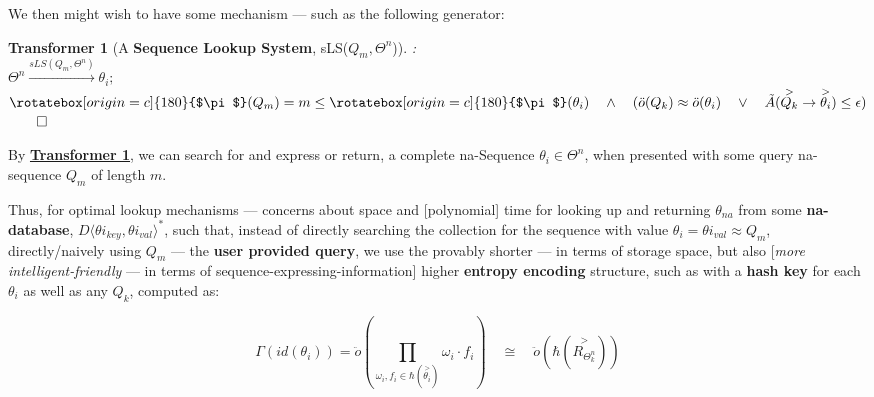 \documentclass[a4paper, 18pt]{book} %
\newtheorem{transf}{Transformer}
\newcommand{\invpi}{\rotatebox[origin=c]{180}{$\pi$}}
\begin{document}
We then might wish to have some mechanism --- such as the following generator:

\vspace{1em}
\begin{transf}[A \textbf{Sequence Lookup System}, sLS($Q_m,\Theta^n$)]:
\label{TRANSFSEQLOOKUP}
$ $\\
$\Theta^n \xrightarrow{sLS(Q_m,\Theta^n)} \theta_i;$\\ 
$\invpi(Q_m) = m \leq \invpi(\theta_i) \quad \land \quad (\ddot{o}(Q_k) \approx \ddot{o}(\theta_i) \quad \lor \quad \tilde{A}(\overset{>}{Q_k} \rightarrow \overset{>}{\theta_i}) \leq \epsilon)$\\
$\qed$
\end{transf}
\vspace{1em}


By \textbf{\hyperref[TRANSFSEQLOOKUP]{Transformer \ref{TRANSFSEQLOOKUP}}}, we can search for and express or return, a complete na-Sequence $\theta_i \in \Theta^n$, when presented with some query na-sequence $Q_m$ of length $m$.

Thus, for optimal lookup mechanisms --- concerns about space and [polynomial] time for looking up and returning $\theta_{na}$ from some \textbf{na-database}, $D\langle {\theta i}_{key}, {\theta i}_{val} \rangle^*$, such that, instead of directly searching the collection for the sequence with value $\theta_i = {\theta i}_{val} \approx Q_m$, directly/naively using $Q_m$ --- the \textbf{user provided query}, we use the provably shorter --- in terms of storage space, but also [\textit{more intelligent-friendly} --- in terms of sequence-expressing-information] higher \textbf{entropy encoding} structure, such as with a \textbf{hash key} for each $\theta_i$ as well as any $Q_k$, computed as:

\vspace{1em}
\begin{equation}
\label{EQHASHKEYSEQ}
 \Gamma (id(\theta_i)) = \ddot{o}(\prod\limits_{\omega_i,f_i \in \hbar(\overset{>}{\theta_i})} \omega_i\cdot f_i) \quad \cong \quad \ddot{o}(\hbar(\overset{>}{R_{\Theta^n_k}}))
\end{equation}
\vspace{1em}
\end{document}
